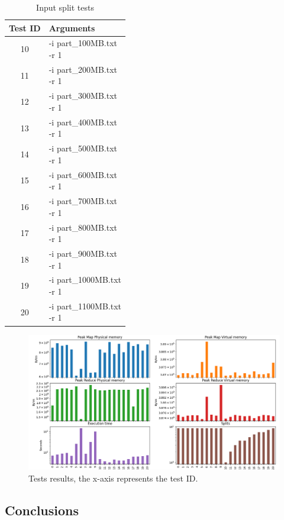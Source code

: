 \documentclass{article}
\begin{document}
\begin{multicols}{2}
\begin{table}[H]
\begin{tabular}{|c|l|}
        Test ID & Arguments \\
        \hline
        10 & \makecell[l]{-i part\_100MB.txt \\ -r 1} \\  
        \hline      
        11 & \makecell[l]{-i part\_200MB.txt \\ -r 1} \\  
        \hline      
        12 & \makecell[l]{-i part\_300MB.txt \\ -r 1} \\        
        \hline
        13 & \makecell[l]{-i part\_400MB.txt \\ -r 1} \\        
        \hline
        14 & \makecell[l]{-i part\_500MB.txt \\ -r 1} \\        
        \hline
        15 & \makecell[l]{-i part\_600MB.txt \\ -r 1} \\        
        \hline
        16 & \makecell[l]{-i part\_700MB.txt \\ -r 1} \\        
        \hline
        17 & \makecell[l]{-i part\_800MB.txt \\ -r 1} \\        
        \hline
        18 & \makecell[l]{-i part\_900MB.txt \\ -r 1} \\        
        \hline
        19 & \makecell[l]{-i part\_1000MB.txt \\ -r 1} \\        
        \hline
        20 & \makecell[l]{-i part\_1100MB.txt \\ -r 1} \\            
        \hline
    \end{tabular}
    \caption{Input split tests}
    \label{tab:input_split_tests}
\end{table}

\end{multicols}
\begin{figure}[H]
    \centering
    \includegraphics[width=1\textwidth]{figures/experiments.png}
    \caption{Tests results, the x-axis represents the test ID.}
    \label{fig:tests_graph}
\end{figure}
\begin{multicols}{2}
\section{Conclusions}
\end{multicols}
\end{document}
